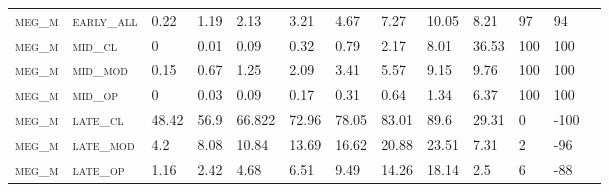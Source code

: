 \begin{landscape}
\begin{table}[!htbp]
\begin{tabular}{@{}lllllllllllll@{}}
\footnotesize \textsc{meg\_m}      & \footnotesize \textsc{early\_all}                & \footnotesize 0.22          & \footnotesize 1.19           & \footnotesize 2.13             & \footnotesize 3.21            & \footnotesize 4.67            & \footnotesize 7.27            & \footnotesize 10.05      & \footnotesize 8.21     & \footnotesize 97     & \footnotesize 94    \\
\footnotesize \textsc{meg\_m}      & \footnotesize \textsc{mid\_cl   }                & \footnotesize 0             & \footnotesize 0.01           & \footnotesize 0.09             & \footnotesize 0.32            & \footnotesize 0.79            & \footnotesize 2.17            & \footnotesize 8.01       & \footnotesize 36.53    & \footnotesize 100    & \footnotesize 100    \\
\footnotesize \textsc{meg\_m}      & \footnotesize \textsc{mid\_mod  }                & \footnotesize 0.15          & \footnotesize 0.67           & \footnotesize 1.25             & \footnotesize 2.09            & \footnotesize 3.41            & \footnotesize 5.57            & \footnotesize 9.15       & \footnotesize 9.76     & \footnotesize 100    & \footnotesize 100    \\
\footnotesize \textsc{meg\_m}      & \footnotesize \textsc{mid\_op   }                & \footnotesize 0             & \footnotesize 0.03           & \footnotesize 0.09             & \footnotesize 0.17            & \footnotesize 0.31            & \footnotesize 0.64            & \footnotesize 1.34       & \footnotesize 6.37     & \footnotesize 100    & \footnotesize 100    \\
\footnotesize \textsc{meg\_m}      & \footnotesize \textsc{late\_cl  }                & \footnotesize 48.42         & \footnotesize 56.9           & \footnotesize 66.822           & \footnotesize 72.96           & \footnotesize 78.05           & \footnotesize 83.01           & \footnotesize 89.6       & \footnotesize 29.31    & \footnotesize 0      & \footnotesize -100    \\
\footnotesize \textsc{meg\_m}      & \footnotesize \textsc{late\_mod }                & \footnotesize 4.2           & \footnotesize 8.08           & \footnotesize 10.84            & \footnotesize 13.69           & \footnotesize 16.62           & \footnotesize 20.88           & \footnotesize 23.51      & \footnotesize 7.31     & \footnotesize 2      & \footnotesize -96    \\
\footnotesize \textsc{meg\_m}      & \footnotesize \textsc{late\_op  }                & \footnotesize 1.16          & \footnotesize 2.42           & \footnotesize 4.68             & \footnotesize 6.51            & \footnotesize 9.49            & \footnotesize 14.26           & \footnotesize 18.14      & \footnotesize 2.5      & \footnotesize 6      & \footnotesize -88    \\

\end{tabular}
\end{table}
\end{landscape}
